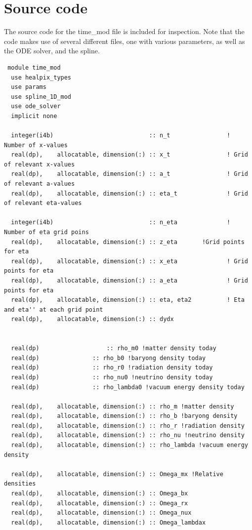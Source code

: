 \documentclass{aa}   %
\begin{document}
\section{Source code}\label{sec:files}
The source code for the time\_mod file is included for inspection. Note that the code makes use of several different files, one with various parameters, as well as the ODE solver, and the spline.
\begin{verbatim}
 module time_mod
  use healpix_types
  use params
  use spline_1D_mod
  use ode_solver
  implicit none

  integer(i4b)                           :: n_t                ! Number of x-values
  real(dp),    allocatable, dimension(:) :: x_t                ! Grid of relevant x-values
  real(dp),    allocatable, dimension(:) :: a_t                ! Grid of relevant a-values
  real(dp),    allocatable, dimension(:) :: eta_t              ! Grid of relevant eta-values

  integer(i4b)                           :: n_eta              ! Number of eta grid poins
  real(dp),    allocatable, dimension(:) :: z_eta 		!Grid points for eta
  real(dp),    allocatable, dimension(:) :: x_eta              ! Grid points for eta
  real(dp),    allocatable, dimension(:) :: a_eta              ! Grid points for eta
  real(dp),    allocatable, dimension(:) :: eta, eta2          ! Eta and eta'' at each grid point
  real(dp),    allocatable, dimension(:) :: dydx


  real(dp)    				 :: rho_m0 !matter density today
  real(dp) 				 :: rho_b0 !baryong density today
  real(dp)				 :: rho_r0 !radiation density today
  real(dp) 				 :: rho_nu0 !neutrino density today
  real(dp)				 :: rho_lambda0 !vacuum energy density today

  real(dp),    allocatable, dimension(:) :: rho_m !matter density
  real(dp),    allocatable, dimension(:) :: rho_b !baryong density
  real(dp),    allocatable, dimension(:) :: rho_r !radiation density
  real(dp),    allocatable, dimension(:) :: rho_nu !neutrino density
  real(dp),    allocatable, dimension(:) :: rho_lambda !vacuum energy density

  real(dp),    allocatable, dimension(:) :: Omega_mx !Relative densities
  real(dp),    allocatable, dimension(:) :: Omega_bx
  real(dp),    allocatable, dimension(:) :: Omega_rx 
  real(dp),    allocatable, dimension(:) :: Omega_nux 
  real(dp),    allocatable, dimension(:) :: Omega_lambdax 


\end{verbatim}
\end{document}
